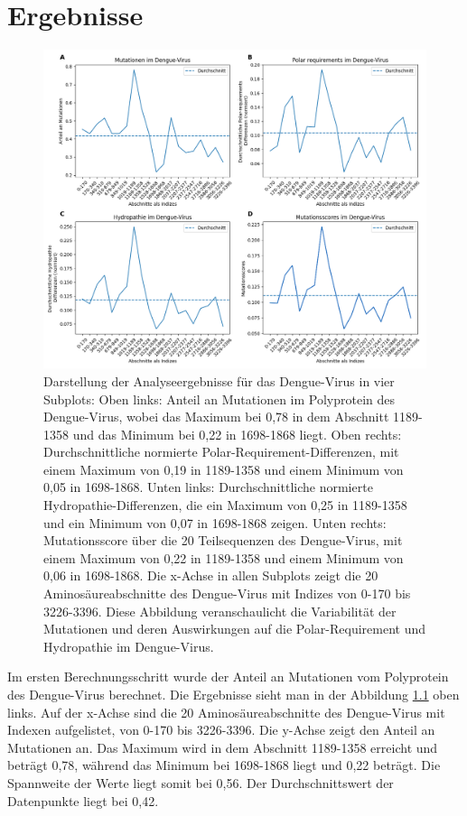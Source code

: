 \documentclass[german,version-2022-01]{uzl-thesis}
\begin{document}
\chapter{Ergebnisse}
\begin{figure}[tbp]
  \centering
  \includegraphics[scale=0.36]{Images/Diagramm_combined_pictures_Dengue_virus.png}
  \caption{Darstellung der Analyseergebnisse f\"ur das Dengue-Virus in vier Subplots: Oben links: Anteil an Mutationen im Polyprotein des Dengue-Virus, wobei das Maximum bei 0,78 in dem Abschnitt 1189-1358 und das Minimum bei 0,22 in 1698-1868 liegt. Oben rechts: Durchschnittliche normierte Polar-Requirement-Differenzen, mit einem Maximum von 0,19 in 1189-1358 und einem Minimum von 0,05 in 1698-1868. Unten links: Durchschnittliche normierte Hydropathie-Differenzen, die ein Maximum von 0,25 in 1189-1358 und ein Minimum von 0,07 in 1698-1868 zeigen. Unten rechts: Mutationsscore \"uber die 20 Teilsequenzen des Dengue-Virus, mit einem Maximum von 0,22 in 1189-1358 und einem Minimum von 0,06 in 1698-1868. Die x-Achse in allen Subplots zeigt die 20 Aminos\"aureabschnitte des Dengue-Virus mit Indizes von 0-170 bis 3226-3396. Diese Abbildung veranschaulicht die Variabilit\"at der Mutationen und deren Auswirkungen auf die Polar-Requirement und Hydropathie im Dengue-Virus.}
  \label{fig:Dengue_virus_combined}
\end{figure}


Im ersten Berechnungsschritt wurde der Anteil an Mutationen vom Polyprotein des Dengue-Virus berechnet. Die Ergebnisse sieht man in der Abbildung \ref{fig:Dengue_virus_combined} oben links. Auf der x-Achse sind die 20 Aminos\"aureabschnitte des Dengue-Virus mit Indexen aufgelistet, von 0-170 bis 3226-3396. Die y-Achse zeigt den Anteil an Mutationen an. Das Maximum wird in dem Abschnitt 1189-1358 erreicht und betr\"agt 0,78, w\"ahrend das Minimum bei 1698-1868 liegt und 0,22 betr\"agt. Die Spannweite der Werte liegt somit bei 0,56. Der Durchschnittswert der Datenpunkte liegt bei 0,42. 
\end{document}
